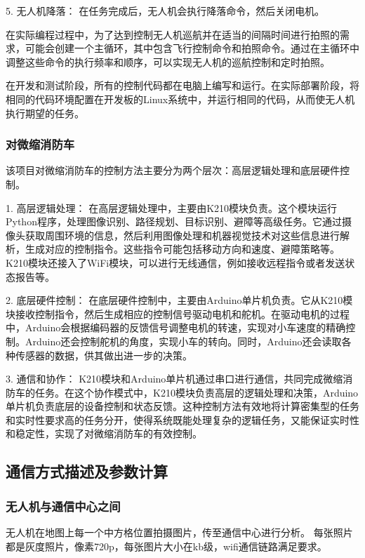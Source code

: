 \documentclass[12pt, a4paper, oneside]{article}
\begin{document}
5. 无人机降落： 在任务完成后，无人机会执行降落命令，然后关闭电机。

在实际编程过程中，为了达到控制无人机巡航并在适当的间隔时间进行拍照的需求，可能会创建一个主循环，其中包含飞行控制命令和拍照命令。通过在主循环中调整这些命令的执行频率和顺序，可以实现无人机的巡航控制和定时拍照。

在开发和测试阶段，所有的控制代码都在电脑上编写和运行。在实际部署阶段，将相同的代码环境配置在开发板的Linux系统中，并运行相同的代码，从而使无人机执行期望的任务。

\subsubsection{对微缩消防车}

该项目对微缩消防车的控制方法主要分为两个层次：高层逻辑处理和底层硬件控制。

1. 高层逻辑处理： 在高层逻辑处理中，主要由K210模块负责。这个模块运行Python程序，处理图像识别、路径规划、目标识别、避障等高级任务。它通过摄像头获取周围环境的信息，然后利用图像处理和机器视觉技术对这些信息进行解析，生成对应的控制指令。这些指令可能包括移动方向和速度、避障策略等。K210模块还接入了WiFi模块，可以进行无线通信，例如接收远程指令或者发送状态报告等。

2. 底层硬件控制： 在底层硬件控制中，主要由Arduino单片机负责。它从K210模块接收控制指令，然后生成相应的控制信号驱动电机和舵机。在驱动电机的过程中，Arduino会根据编码器的反馈信号调整电机的转速，实现对小车速度的精确控制。Arduino还会控制舵机的角度，实现小车的转向。同时，Arduino还会读取各种传感器的数据，供其做出进一步的决策。

3. 通信和协作： K210模块和Arduino单片机通过串口进行通信，共同完成微缩消防车的任务。在这个协作模式中，K210模块负责高层的逻辑处理和决策，Arduino单片机负责底层的设备控制和状态反馈。这种控制方法有效地将计算密集型的任务和实时性要求高的任务分开，使得系统既能处理复杂的逻辑任务，又能保证实时性和稳定性，实现了对微缩消防车的有效控制。

\subsection{通信方式描述及参数计算}

\subsubsection{无人机与通信中心之间}

无人机在地图上每一个中方格位置拍摄图片，传至通信中心进行分析。
每张照片都是灰度照片，像素720p，每张图片大小在kb级，wifi通信链路满足要求。
\end{document}
